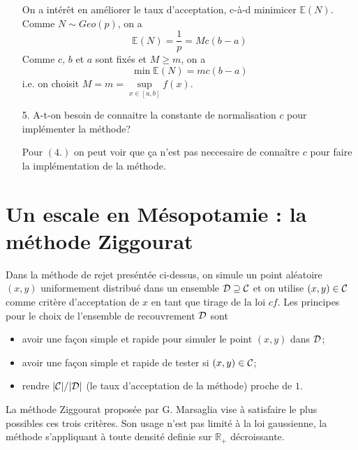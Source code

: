 \documentclass[a4paper]{article}
\begin{document}
\begin{enumerate}
On a int\'er\^et en am\'eliorer le taux d'acceptation, c-\`a-d minimicer $\mathbb{E}(N)$. Comme $N\sim Geo(p)$, on a 
$$\mathbb{E}(N) = \frac{1}{p} = Mc(b-a)$$
Comme $c,\,b$ et $a$ sont fix\'es et $M\geq m$, on a
$$\min \mathbb{E}(N) = mc(b-a)$$
i.e. on choisit $M=m = \sup\limits_{x\in[a,b]}f(x)$.

\item[5.] A-t-on besoin de connaitre la constante de normalisation $c$ pour impl\'ementer la m\'ethode?

Pour $(4.)$ on peut voir que \c{c}a n'est pas neccesaire de conna\^itre $c$ pour faire la impl\'ementation de la m\'ethode.

\end{enumerate}

\section{Un escale en M\'esopotamie : la m\'ethode Ziggourat}

Dans la m\'ethode de rejet pres\'ent\'ee ci-dessus, on simule un point al\'eatoire $(x,y)$ uniformement distribu\'e dans un ensemble ${\cal D}\supseteq {\cal C}$ et on utilise $(x,y)\in{\cal C}$ comme crit\`ere d'acceptation de $x$ en tant que tirage de la loi $cf$. Les principes pour le choix de l'ensemble de recouvrement ${\cal D}$ sont
\begin{itemize}
\item avoir une fa\c{c}on simple et rapide pour simuler le point $(x,y)$ dans ${\cal D}$;
\item avoir une fa\c{c}on simple et rapide de tester si $(x,y)\in{\cal C}$;
\item rendre $|{\cal C}|/|{\cal D}|$ (le taux d'acceptation de la m\'ethode) proche de $1$.
\end{itemize}
La m\'ethode Ziggourat propos\'ee par G. Marsaglia vise \`a satisfaire le plus possibles ces trois crit\`eres. Son usage n'est pas limit\'e \`a la loi gaussienne, la m\'ethode s'appliquant \`a toute densit\'e definie sur $\mathbb{R}_+$ d\'ecroissante.
\end{document}
